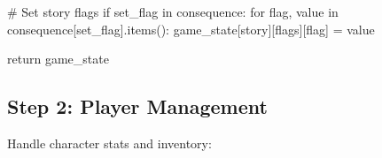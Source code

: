 \documentclass[
  letterpaper,
  DIV=11,
  numbers=noendperiod,
  oneside]{scrreprt}
\newenvironment{Shaded}{}{}
\newcommand{\CommentTok}[1]{\textcolor[rgb]{0.42,0.45,0.49}{#1}}
\newcommand{\ControlFlowTok}[1]{\textcolor[rgb]{0.84,0.23,0.29}{#1}}
\newcommand{\KeywordTok}[1]{\textcolor[rgb]{0.84,0.23,0.29}{#1}}
\newcommand{\NormalTok}[1]{\textcolor[rgb]{0.14,0.16,0.18}{#1}}
\newcommand{\OperatorTok}[1]{\textcolor[rgb]{0.14,0.16,0.18}{#1}}
\newcommand{\StringTok}[1]{\textcolor[rgb]{0.01,0.18,0.38}{#1}}
\begin{document}
\begin{Shaded}
\begin{Highlighting}[]
        \CommentTok{\# Set story flags}
        \ControlFlowTok{if} \StringTok{\textquotesingle{}set\_flag\textquotesingle{}} \KeywordTok{in}\NormalTok{ consequence:}
            \ControlFlowTok{for}\NormalTok{ flag, value }\KeywordTok{in}\NormalTok{ consequence[}\StringTok{\textquotesingle{}set\_flag\textquotesingle{}}\NormalTok{].items():}
\NormalTok{                game\_state[}\StringTok{\textquotesingle{}story\textquotesingle{}}\NormalTok{][}\StringTok{\textquotesingle{}flags\textquotesingle{}}\NormalTok{][flag] }\OperatorTok{=}\NormalTok{ value}
        
        \ControlFlowTok{return}\NormalTok{ game\_state}
\end{Highlighting}
\end{Shaded}

\subsection{Step 2: Player Management}\label{step-2-player-management}

Handle character stats and inventory:
\end{document}
